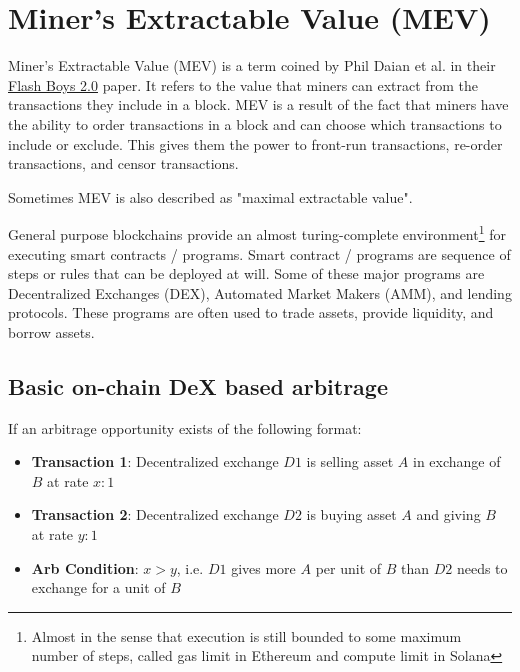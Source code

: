 \section{Miner's Extractable Value (MEV)}
Miner's Extractable Value (MEV) is a term coined by Phil Daian et al. in their \href{https://arxiv.org/pdf/1904.05234}{Flash Boys 2.0} paper. It refers to the value that miners can extract from the transactions they include in a block. MEV is a result of the fact that miners have the ability to order transactions in a block and can choose which transactions to include or exclude. This gives them the power to front-run transactions, re-order transactions, and censor transactions. 

Sometimes MEV is also described as "maximal extractable value".

General purpose blockchains provide an almost turing-complete environment\footnote{Almost in the sense that execution is still bounded to some maximum number of steps, called gas limit in Ethereum and compute limit in Solana} for executing smart contracts / programs. Smart contract / programs are sequence of steps or rules that can be deployed at will. Some of these major programs are Decentralized Exchanges (DEX), Automated Market Makers (AMM), and lending protocols. These programs are often used to trade assets, provide liquidity, and borrow assets.

\subsection{Basic on-chain DeX based arbitrage}

If an arbitrage opportunity exists of the following format:
\begin{itemize}
    \item \textbf{Transaction 1}: Decentralized exchange $D1$ is selling asset $A$ in exchange of $B$ at rate $x:1$
    \item \textbf{Transaction 2}: Decentralized exchange $D2$ is buying asset $A$ and giving $B$ at rate $y:1$
    \item \textbf{Arb Condition}: $x > y$, i.e. $D1$ gives more $A$ per unit of $B$ than $D2$ needs to exchange for a unit of $B$
\end{itemize}